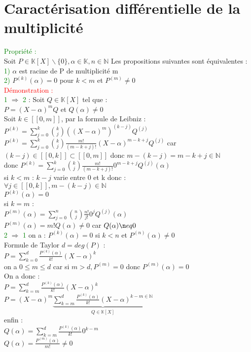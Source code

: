 \documentclass{article}
\begin{document}
\section{Caractérisation différentielle de la multiplicité}
\textcolor{green}{Propriété :} \\
Soit $P \in \mathbb K [X] \backslash \lbrace 0 \rbrace, \alpha \in \mathbb K, n \in \mathbb N$ Les propositions suivantes sont équivalentes : \\
\textcolor{green}{1)} $\alpha$ est racine de P de multiplicité m \\
\textcolor{green}{2)} $P^{(k)}(\alpha)=0$ pour $k<m$ et $P^{(m)}\neq 0$ \\
\textcolor{red}{Démonstration :} \\
\textcolor{green}{1} $\Rightarrow$ \textcolor{green}{2} : Soit $Q \in \mathbb K [X]$ tel que : \\
$P=(X-\alpha)^mQ$ et $Q(\alpha)\neq0$ \\
Soit $k\in [[0,m]]$, par la formule de Leibniz : \\
$P^{(k)}=\sum_{j=0}^k \binom{k}{j}((X- \alpha)^m)^{(k-j)}Q^{(j)}$
$P^{(k)}=\sum_{j=0}^k \binom{k}{j} \frac{m!}{(m-k+j)!}(X- \alpha)^{m-k+j}Q^{(j)}$ car $(k-j) \in [[0,k]] \subset [[0,m]]$ donc $m-(k-j)=m-k+j \in \mathbb N$ \\
donc $P^{(k)}=\sum_{j=0}^k \binom{k}{j} \frac{m!}{(m-k+j)!}0^{m-k+j}Q^{(j)}(\alpha)$ \\
si $k<m$ : $k-j$ varie entre 0 et k donc : \\
$\forall j \in [[0,k]], m-(k-j) \in \mathbb N$ \\
$P^{(k)}(\alpha)=0$ \\
si $k=m$ : \\
$P^{(m)}(\alpha)=\sum_{j=0}^n \binom{n}{j} \frac{n!}{j!}0^j Q^{(j)}(\alpha)$ \\
$P^{(m)}(\alpha)=m! Q(\alpha) \neq 0$ car $Q(\alpha) \n eq 0$ \\
\textcolor{green}{2} $\Rightarrow$ \textcolor{green}{1} on a : $P^{(k)}(\alpha)=0$ si $k<n$ et $P^{(n)}(\alpha)\neq 0$ \\
Formule de Taylor $d=deg(P)$ : \\
$P=\sum_{k=0}^d \frac{P^{(k)}(\alpha)}{k!}(X-\alpha)^k$ \\
on a $0 \leq m \leq d$ car si $m>d,P^{(m)}=0$ donc $P^{(m)}(\alpha)=0$ \\
On a donc : \\
$P=\sum_{k=m}^d \frac{P^{(k)}(\alpha)}{k!}(X-\alpha)^k$ \\
$P=(X-\alpha)^m\underbrace{\sum_{k=m}^d \frac{P^{(k)}(\alpha)}{k!}(X-\alpha)^{k-m \in \mathbb N}}_{Q \in \mathbb K[X]}$ \\
enfin : \\
$Q(\alpha)=\sum_{k=m}^d\frac{P^{(k)}(\alpha)}{k!}0^{k-m} $ \\
$Q(\alpha)=\frac{P^{(m)}(\alpha)}{m!} \neq 0$
\end{document}
